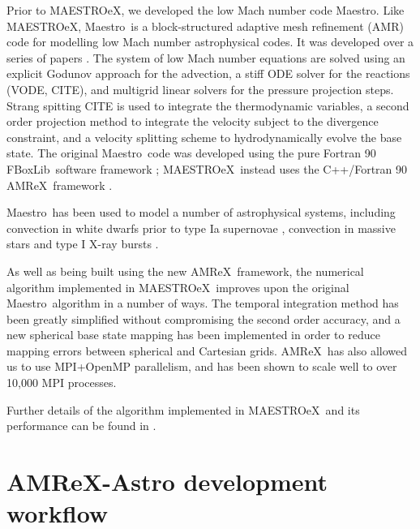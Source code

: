 \documentclass[a4paper]{jpconf}
\newcommand{\maestro}{{\sffamily Maestro}}
\newcommand{\maestroex}{{\sffamily MAESTROeX}}
\newcommand{\amrex}{{\sffamily AMReX}}
\newcommand{\fboxlib}{{\sffamily FBoxLib}}
\begin{document}

Prior to \maestroex, we developed the low Mach number code \maestro. Like \maestroex, \maestro~is a block-structured adaptive mesh refinement (AMR) code for modelling low Mach number astrophysical codes. It was developed over a series of papers \cite{Almgren2006a,Almgren2006b,Almgren2008a,Zingale2009,Nonaka2010}. The system of low Mach number equations are solved using an explicit Godunov approach for the advection, a stiff ODE solver for the reactions (VODE, CITE), and multigrid linear solvers for the pressure projection steps. Strang spitting CITE is used to integrate the thermodynamic variables, a second order projection method to integrate the velocity subject to the divergence constraint, and a velocity splitting scheme to hydrodynamically evolve the base state. The original \maestro~code was developed using the pure Fortran 90 \fboxlib~software framework \cite{Zhang2016}; \maestroex~instead uses the C++/Fortran 90 \amrex~framework \cite{Zhang2019}. 

\maestro~has been used to model a number of astrophysical systems, including convection in white dwarfs prior to type Ia supernovae \cite{Zingale2011,Nonaka2011,Malone2014a,Zingale2013,Jacobs2016}, convection in massive stars \cite{Gilet2013} and type I X-ray bursts \cite{Malone2011,Malone2014,Zingale2015}. 

As well as being built using the new \amrex~framework, the numerical algorithm implemented in \maestroex~improves upon the original \maestro~algorithm in a number of ways. The temporal integration method has been greatly simplified without compromising the second order accuracy, and a new spherical base state mapping has been implemented in order to reduce mapping errors between spherical and Cartesian grids. \amrex~has also allowed us to use MPI+OpenMP parallelism, and has been shown to scale well to over 10,000 MPI processes. 

Further details of the algorithm implemented in \maestroex~and its performance can be found in \cite{Fan2019}.



\section{AMReX-Astro development workflow} \label{sec:workflow}

\end{document}

